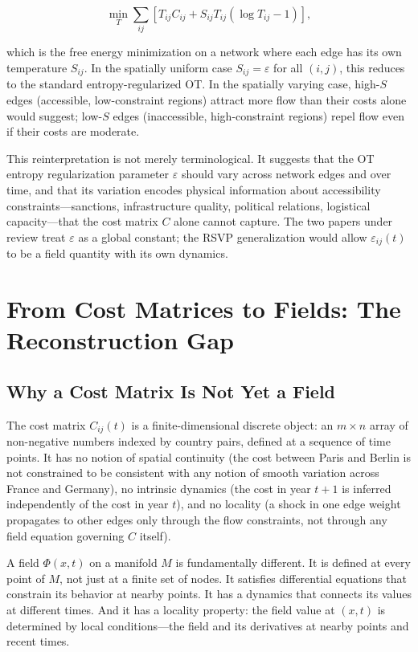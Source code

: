 \documentclass[12pt]{article}
\newcommand{\Tij}{T_{ij}}
\newcommand{\Cij}{C_{ij}}
\newcommand{\eps}{\varepsilon}
\begin{document}
\begin{equation}
\min_{T} \sum_{ij} \left[\Tij \Cij + S_{ij} \Tij(\log \Tij - 1)\right],
\label{eq:rsvp_ot}
\end{equation}

which is the free energy minimization on a network where each edge has its own temperature $S_{ij}$. In the spatially uniform case $S_{ij} = \eps$ for all $(i,j)$, this reduces to the standard entropy-regularized OT. In the spatially varying case, high-$S$ edges (accessible, low-constraint regions) attract more flow than their costs alone would suggest; low-$S$ edges (inaccessible, high-constraint regions) repel flow even if their costs are moderate.

This reinterpretation is not merely terminological. It suggests that the OT entropy regularization parameter $\eps$ should vary across network edges and over time, and that its variation encodes physical information about accessibility constraints---sanctions, infrastructure quality, political relations, logistical capacity---that the cost matrix $C$ alone cannot capture. The two papers under review treat $\eps$ as a global constant; the RSVP generalization would allow $\eps_{ij}(t)$ to be a field quantity with its own dynamics.

\section{From Cost Matrices to Fields: The Reconstruction Gap}

\subsection{Why a Cost Matrix Is Not Yet a Field}

The cost matrix $C_{ij}(t)$ is a finite-dimensional discrete object: an $m \times n$ array of non-negative numbers indexed by country pairs, defined at a sequence of time points. It has no notion of spatial continuity (the cost between Paris and Berlin is not constrained to be consistent with any notion of smooth variation across France and Germany), no intrinsic dynamics (the cost in year $t+1$ is inferred independently of the cost in year $t$), and no locality (a shock in one edge weight propagates to other edges only through the flow constraints, not through any field equation governing $C$ itself).

A field $\Phi(x,t)$ on a manifold $M$ is fundamentally different. It is defined at every point of $M$, not just at a finite set of nodes. It satisfies differential equations that constrain its behavior at nearby points. It has a dynamics that connects its values at different times. And it has a locality property: the field value at $(x,t)$ is determined by local conditions---the field and its derivatives at nearby points and recent times.
\end{document}

